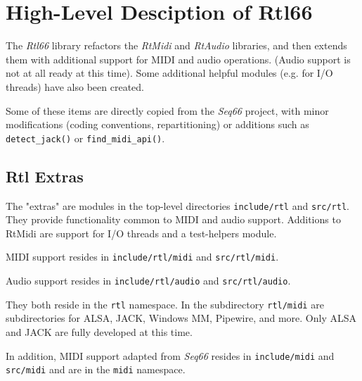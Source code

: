 %
%
%

\section{High-Level Desciption of Rtl66}
\label{sec:rtl_high_level}

   The \textsl{Rtl66} library refactors the \textsl{RtMidi} and
   \textsl{RtAudio} libraries, and then extends them with additional
   support for MIDI and audio operations.
   (Audio support is not at all ready at this time).
   Some additional helpful modules (e.g. for I/O threads) have also
   been created.

   Some of these items are directly copied from the \textsl{Seq66}
   project, with minor modifications (coding conventions,
   repartitioning) or additions such as \texttt{detect\_jack()}
   or \texttt{find\_midi\_api()}.

\subsection{Rtl Extras}
\label{subsec:rtl_extras}

   The "extras" are modules in the top-level directories
   \texttt{include/rtl} and \texttt{src/rtl}.
   They provide functionality common to MIDI and audio support.
   Additions to RtMidi are support for I/O threads and a
   test-helpers module.

   MIDI support resides in
   \texttt{include/rtl/midi} and \texttt{src/rtl/midi}.

   Audio support resides in
   \texttt{include/rtl/audio} and \texttt{src/rtl/audio}.

   They both reside in the \texttt{rtl} namespace.
   In the subdirectory \texttt{rtl/midi} are subdirectories for
   ALSA, JACK, Windows MM, Pipewire, and more.
   Only ALSA and JACK are fully developed at this time.

   In addition, MIDI support adapted from \textsl{Seq66} resides in
   \texttt{include/midi} and \texttt{src/midi} and are in
   the \texttt{midi} namespace.

